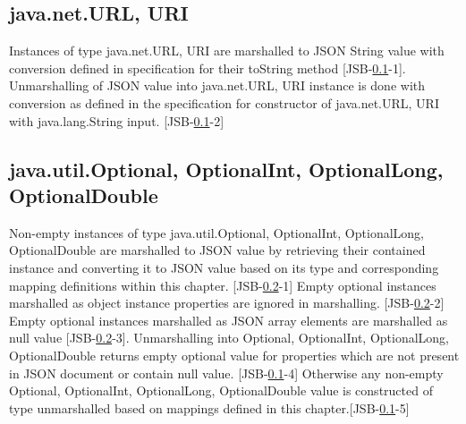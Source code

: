 \subsection{java.net.URL, URI}
\label{subsec:url}
Instances of type java.net.URL, URI are marshalled to JSON String value with conversion defined in specification for their toString method [JSB-\ref{subsec:url}-1]. Unmarshalling of JSON value into java.net.URL, URI instance is done with conversion as defined in the specification for constructor of java.net.URL, URI with java.lang.String input. [JSB-\ref{subsec:url}-2]

\subsection{java.util.Optional, OptionalInt, OptionalLong, OptionalDouble}
\label{subsec:optional}
Non-empty instances of type java.util.Optional, OptionalInt, OptionalLong, OptionalDouble are marshalled to JSON value by retrieving their contained instance and converting it to JSON value based on its type and corresponding mapping definitions within this chapter. [JSB-\ref{subsec:optional}-1] Empty optional instances marshalled as object instance properties are ignored in marshalling. [JSB-\ref{subsec:optional}-2] Empty optional instances marshalled as JSON array elements are marshalled as null value [JSB-\ref{subsec:optional}-3]. Unmarshalling into Optional, OptionalInt, OptionalLong, OptionalDouble returns empty optional value for properties which are not present in JSON document or contain null value. [JSB-\ref{subsec:url}-4] Otherwise any non-empty Optional, OptionalInt, OptionalLong, OptionalDouble value is constructed of type unmarshalled based on mappings defined in this chapter.[JSB-\ref{subsec:url}-5]


